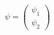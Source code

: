 \begin{equation}
\psi = \left( \begin{array}{c}
\psi_1 \\  \psi_2  \end{array}  \right)
\end{equation}

